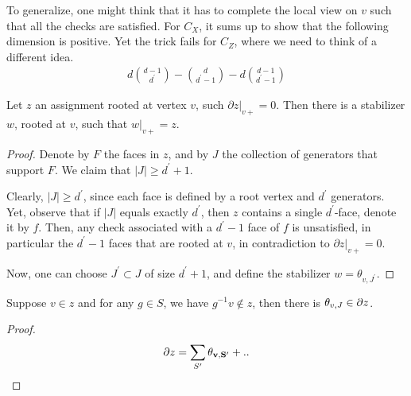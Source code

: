 To generalize, one might think that it has to complete the local view on $v$ such that all the checks are satisfied. For $C_{X}$, it sums up to show that the following dimension is positive. Yet the trick fails for $C_{Z}$, where we need to think of a different idea.
\begin{equation*}
  \begin{split}
    d { d - 1 \choose d^{\prime} } - { d \choose d^{\prime} - 1 } - d { d-1  \choose d^{\prime} - 1 }  
  \end{split}
\end{equation*}


\begin{claim}
  Let $z$ an assignment rooted at vertex $v$, such $\partial z |_{v+} = 0$. Then there is a stabilizer $w$, rooted at $v$, such that $w|_{v+} = z$.  
\end{claim}

\begin{proof}
Denote by $F$ the faces in $z$, and by $J$ the collection of generators that support $F$. We claim that $|J| \ge d^{\prime}+1$.

Clearly, $|J| \ge d^{\prime}$, since each face is defined by a root vertex and $d^{\prime}$ generators. Yet, observe that if $|J|$ equals exactly $d^{\prime}$, then $z$ contains a single $d^{\prime}$-face, denote it by $f$. Then, any check associated with a $d^{\prime}-1$ face of $f$ is unsatisfied, in particular the $d^{\prime}-1$ faces that are rooted at $v$, in contradiction to $\partial z|_{v+} = 0$. 


Now, one can choose $J^{\prime} \subset J$ of size $d^{\prime}+1$, and define the stabilizer $w = \theta_{v,J^{\prime}}$.
    
\end{proof}


\begin{claim} \label{claim:syn_edge}
Suppose $v \in z$ and for any $g \in S$, we have $g^{-1}v \notin z$, then there is $\theta_{v ,J} \in \partial z$.
\end{claim}
\begin{proof}
  
  \begin{equation*}
    \begin{split}
      \partial z = \sum_{S^{\prime}} \mathbf{\theta_{v ,S^{\prime}} } + .. 
    \end{split}
  \end{equation*}
\end{proof}


